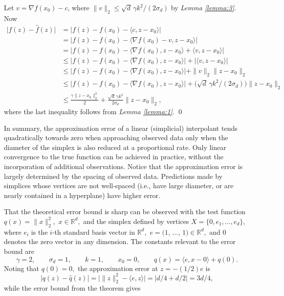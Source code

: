 \documentclass[smallextended,final]{svjour3}  %
\begin{document}
\begin{proofdot}
  Let $v = \nabla f(x_0) - c$, where $\|v\|_2 \leq \sqrt{d}\, \gamma k^2 / (2 \sigma_d)$ by {\it Lemma \ref{lemma:3}}. Now
  \begin{align*}
    \big|f(z) - \hat f(z)\big|
       &= \big|f(z) - f(x_0) - \langle c, z - x_0 \rangle \big| \\ 
       &= \big|f(z) - f(x_0) - \langle \nabla f(x_0) - v, z - x_0 \rangle \big| \\
       &= \big|f(z) - f(x_0) - \langle \nabla f(x_0) , z - x_0 \rangle + \langle v , z - x_0 \rangle \big| \\
       &\leq \big|f(z) - f(x_0) - \langle \nabla f(x_0) , z - x_0 \rangle \big| + \big| \langle v , z - x_0 \rangle \big| \\
       &\leq \big|f(z) - f(x_0) - \langle \nabla f(x_0) , z - x_0 \rangle \big| + \|v\|_2 \|z - x_0\|_2 \\
       &\leq \big|f(z) - f(x_0) - \langle \nabla f(x_0), z - x_0 \rangle \big| + \big(\sqrt{d}\,\gamma k^2 / (2 \sigma_d)\big) \|z - x_0\|_2 \\
       &\leq \frac{\gamma \|z - x_0\|_2^2}{2} + \frac{\sqrt{d}\,\gamma k^2}{2 \sigma_d} \|z - x_0\|_2,
  \end{align*}
  where the last inequality follows from {\it Lemma \ref{lemma:1}}.
  \qed
\end{proofdot}


In summary, the approximation error of a linear (simplicial)
interpolant tends quadratically towards zero when approaching observed
data only when the diameter of the simplex is also reduced at a
proportional rate.  Only linear convergence to the true function can
be achieved in practice, without the incorporation of additional
observations. Notice that the approximation error is largely
determined by the spacing of observed data. Predictions made by
simplices whose vertices are not well-spaced (i.e., have large
diameter, or are nearly contained in a hyperplane) have higher
error.

That the theoretical error bound is sharp can be observed with the
test function $q(x) = \|x\|_2^2,$ $x \in \mathbb{R}^d,$ and the
simplex defined by vertices $X = \{0, e_1, \ldots, e_d\},$ where $e_i$
is the $i$-th standard basis vector in $\mathbb{R}^d,$ $e = (1$,
$\ldots$, $1) \in \mathbb{R}^d,$ and $0$ denotes the zero vector in
any dimension.  The constants relevant to the error bound are
$$ \gamma = 2, \qquad \sigma_d = 1, \qquad k = 1, \qquad x_0 = 0,
\qquad \hat q(x) = \langle e, x - 0\rangle + q(0). $$
\noindent Noting that $q(0) = 0,$ the approximation error at $z =
-(1/2)e$ is
$$ \big|q(z) - \hat q(z)\big| = \big|\|z\|_2^2 - \langle e,z
\rangle\big| = \big| d/4 + d/2 \big| = 3d/4, $$
\noindent while the error bound from the theorem gives
\end{document}

